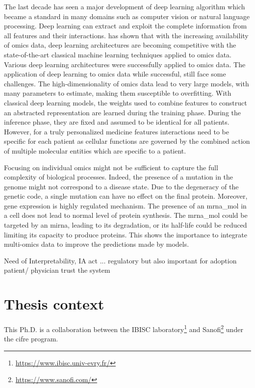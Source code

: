 \documentclass[../main.tex]{subfiles}
\begin{document}
 The last decade has seen a major development of deep learning algorithm which became a standard in many domains such as computer vision or natural language processing.
 Deep learning can extract and exploit the complete information from all features and their interactions. 
 \citeauthor{Hanczar2022} has shown that with the increasing availability of omics data, deep learning architectures are becoming competitive with the state-of-the-art classical machine learning techniques applied to omics data.
 Various deep learning architectures were successfully applied to omics data.
 The application of deep learning to omics data while successful, still face some challenges. 
 The high-dimensionality of omics data lead to very large models, \ie{}with many parameters to estimate, making them susceptible to overfitting.
 With classical deep learning models, the weights used to combine features to construct an abstracted representation are learned during the training phase.
 During the inference phase, they are fixed and assumed to be identical for all patients. 
 However, for a truly personalized medicine features interactions need to be specific for each patient as cellular functions are governed by the combined action of multiple molecular entities which are specific to a patient.

 Focusing on individual omics might not be sufficient to capture the full complexity of biological processes. 
 Indeed, the presence of a mutation in the genome might not correspond to a disease state. 
 Due to the degeneracy of the genetic code, a single mutation can have no effect on the final protein. 
 Moreover, gene expression is highly regulated mechanism. 
 The presence of an \gls{mrna_mol} in a cell does not lead to normal level of protein synthesis. 
 The \gls{mrna_mol} could be targeted by an \gls{mirna}, leading to its degradation, or its half-life could be reduced limiting its capacity to produce proteins. 
 This shows the importance to integrate multi-omics data to improve the predictions made by models.

 Need of Interpretability, IA act ... regulatory but also important for adoption patient/ physician trust the system

\section{Thesis context}
 This Ph.D. is a collaboration between the IBISC laboratory\footnote{\url{https://www.ibisc.univ-evry.fr/}} and Sanofi\footnote{\url{https://www.sanofi.com/}} under the \gls{cifre} program.
\end{document}
